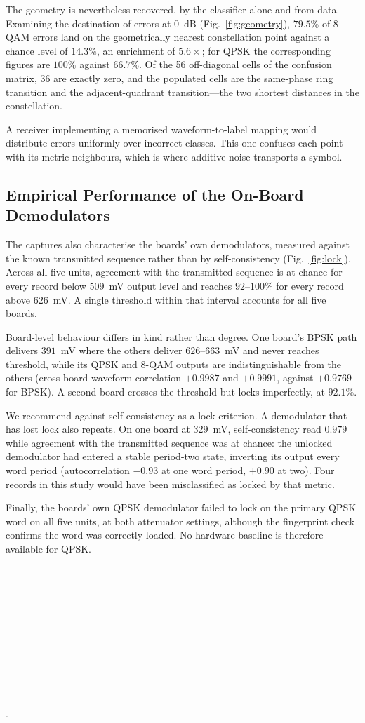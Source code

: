 \documentclass[journal]{IEEEtran}   %
\begin{document}
The geometry is nevertheless recovered, by the classifier alone and from data.
Examining the destination of errors at $0$~dB (Fig.~\ref{fig:geometry}),
$79.5\%$ of 8-QAM errors land on the geometrically nearest constellation point
against a chance level of $14.3\%$, an enrichment of $5.6\times$; for QPSK the
corresponding figures are $100\%$ against $66.7\%$. Of the 56 off-diagonal cells
of the confusion matrix, 36 are exactly zero, and the populated cells are the
same-phase ring transition and the adjacent-quadrant transition---the two
shortest distances in the constellation.

A receiver implementing a memorised waveform-to-label mapping would distribute
errors uniformly over incorrect classes. This one confuses each point with its
metric neighbours, which is where additive noise transports a symbol.


\subsection{Empirical Performance of the On-Board Demodulators}
\label{sec:hardware}
The captures also characterise the boards' own demodulators, measured against
the known transmitted sequence rather than by self-consistency
(Fig.~\ref{fig:lock}). Across all five units, agreement with the transmitted
sequence is at chance for every record below $509$~mV output level and reaches
$92$--$100\%$ for every record above $626$~mV. A single threshold within that
interval accounts for all five boards.

Board-level behaviour differs in kind rather than degree. One board's BPSK path
delivers $391$~mV where the others deliver $626$--$663$~mV and never reaches
threshold, while its QPSK and 8-QAM outputs are indistinguishable from the
others (cross-board waveform correlation $+0.9987$ and $+0.9991$, against
$+0.9769$ for BPSK). A second board crosses the threshold but locks
imperfectly, at $92.1\%$.

We recommend against self-consistency as a lock criterion. A demodulator that
has lost lock also repeats. On one board at $329$~mV, self-consistency read
$0.979$ while agreement with the transmitted sequence was at chance: the
unlocked demodulator had entered a stable period-two state, inverting its output
every word period (autocorrelation $-0.93$ at one word period, $+0.90$ at two).
Four records in this study would have been misclassified as locked by that
metric.

Finally, the boards' own QPSK demodulator failed to lock on the primary QPSK
word on all five units, at both attenuator settings, although the fingerprint
check confirms the word was correctly loaded. No hardware baseline is therefore
available for QPSK.
 \\ \\ \\ \\ \\ \\ \\ \\ \\ 
 \\
 \\
 \\.
\end{document}
